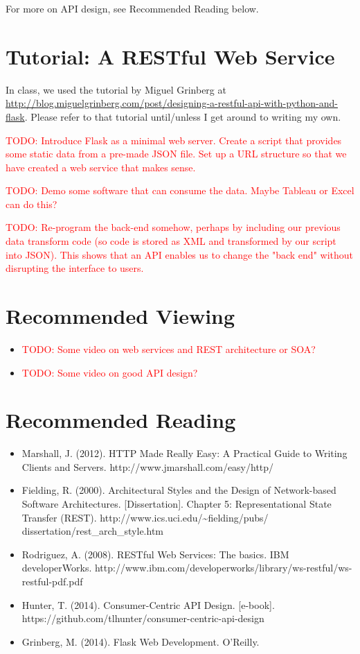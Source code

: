 \documentclass[11pt]{book}
\newcommand{\todo}[1]{\textcolor{red}{TODO: #1}} %
\begin{document}
For more on API design, see Recommended Reading below.


\section*{Tutorial: A RESTful Web Service}

In class, we used the tutorial by Miguel Grinberg at \url{http://blog.miguelgrinberg.com/post/designing-a-restful-api-with-python-and-flask}.  Please refer to that tutorial until/unless I get around to writing my own.

\todo{Introduce Flask as a minimal web server.  Create a script that provides some static data from a pre-made JSON file.  Set up a URL structure so that we have created a web service that makes sense.}

\todo{Demo some software that can consume the data.  Maybe Tableau or Excel can do this?}

\todo{Re-program the back-end somehow, perhaps by including our previous data transform code (so code is stored as XML and transformed by our script into JSON).  This shows that an API enables us to change the "back end" without disrupting the interface to users.}

\section*{Recommended Viewing}
\begin{itemize}
    \item \todo{Some video on web services and REST architecture or SOA?}
    \item \todo{Some video on good API design?}
\end{itemize}

\section*{Recommended Reading}
\begin{itemize}
    \item Marshall, J. (2012).  HTTP Made Really Easy: A Practical Guide to Writing Clients and Servers.  http://www.jmarshall.com/easy/http/
    \item Fielding, R. (2000). Architectural Styles and the Design of Network-based Software Architectures. [Dissertation]. Chapter 5: Representational State Transfer (REST). http://www.ics.uci.edu/\~{}fielding/pubs/ dissertation/rest\_arch\_style.htm
    \item Rodriguez, A. (2008). RESTful Web Services: The basics.  IBM developerWorks. http://www.ibm.com/developerworks/library/ws-restful/ws-restful-pdf.pdf
    \item Hunter, T. (2014). Consumer-Centric API Design. [e-book]. \\https://github.com/tlhunter/consumer-centric-api-design
    \item Grinberg, M. (2014).  Flask Web Development.  O'Reilly.
\end{itemize}
\end{document}
